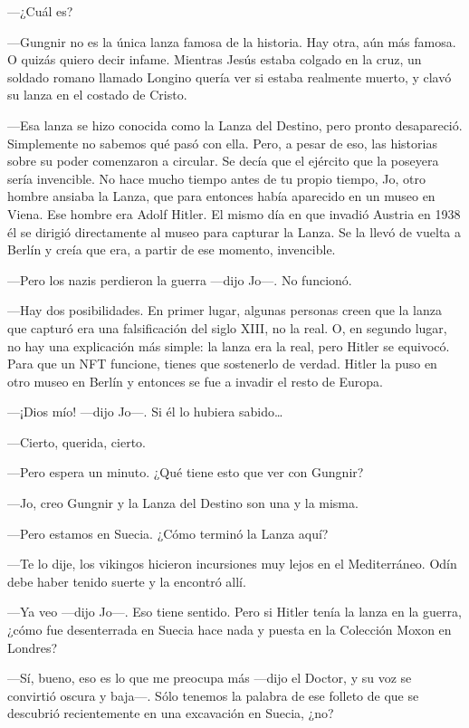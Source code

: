 ---¿Cuál es?

---Gungnir no es la única lanza famosa de la historia. Hay otra, aún más
famosa. O quizás quiero decir infame. Mientras Jesús estaba colgado en
la cruz, un soldado romano llamado Longino quería ver si estaba
realmente muerto, y clavó su lanza en el costado de Cristo.

---Esa lanza se hizo conocida como la Lanza del Destino, pero pronto
desapareció. Simplemente no sabemos qué pasó con ella. Pero, a pesar de
eso, las historias sobre su poder comenzaron a circular. Se decía que el
ejército que la poseyera sería invencible. No hace mucho tiempo antes de
tu propio tiempo, Jo, otro hombre ansiaba la Lanza, que para entonces
había aparecido en un museo en Viena. Ese hombre era Adolf Hitler. El
mismo día en que invadió Austria en 1938 él se dirigió directamente al
museo para capturar la Lanza. Se la llevó de vuelta a Berlín y creía que
era, a partir de ese momento, invencible.

---Pero los nazis perdieron la guerra ---dijo Jo---. No funcionó.

---Hay dos posibilidades. En primer lugar, algunas personas creen que la
lanza que capturó era una falsificación del siglo XIII, no la real. O,
en segundo lugar, no hay una explicación más simple: la lanza era la
real, pero Hitler se equivocó. Para que un NFT funcione, tienes que
sostenerlo de verdad. Hitler la puso en otro museo en Berlín y entonces
se fue a invadir el resto de Europa.

---¡Dios mío! ---dijo Jo---. Si él lo hubiera sabido\ldots{}

---Cierto, querida, cierto.

---Pero espera un minuto. ¿Qué tiene esto que ver con Gungnir?

---Jo, creo Gungnir y la Lanza del Destino son una y la misma.

---Pero estamos en Suecia. ¿Cómo terminó la Lanza aquí?

---Te lo dije, los vikingos hicieron incursiones muy lejos en el
Mediterráneo. Odín debe haber tenido suerte y la encontró allí.

---Ya veo ---dijo Jo---. Eso tiene sentido. Pero si Hitler tenía la
lanza en la guerra, ¿cómo fue desenterrada en Suecia hace nada y puesta
en la Colección Moxon en Londres?

---Sí, bueno, eso es lo que me preocupa más ---dijo el Doctor, y su voz
se convirtió oscura y baja---. Sólo tenemos la palabra de ese folleto de
que se descubrió recientemente en una excavación en Suecia, ¿no?

